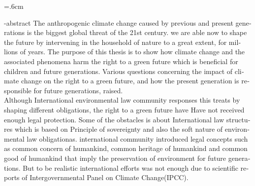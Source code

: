 \baselineskip=.6cm
\begin{latin}
\en-abstract{\noindent
The anthropogenic climate change caused by previous and present generations is the biggest global threat of the 21st century. we are able now to shape the future by intervening in the household of nature to a great extent, for millions of years. 
The purpose of this thesis is to show how climate change and
the associated phenomena harm the right to a green future which is beneficial for children and future generations.
Various questions concerning the impact of climate change on the right to a green future, and how the present generation is responsible for future generations, raised.\\
Although International environmental law community responses this treats by shaping different obligations, the right to a green future have Have not received enough legal protection. Some of the obstacles is about International law structures which is based on Principle of sovereignty and also the soft nature of environmental law obligationas.
international community introduced legal concepts such as common concern of humankind, common heritage of humankind and common good of humankind that imply the preservation of environment for future generations. But to be realistic international efforts was not enough due to scientific reports of Intergovernmental Panel on Climate Change(IPCC). 
}
\latinvtitle
\end{latin}
